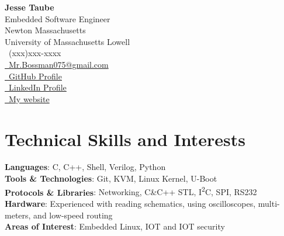 \documentclass[a4paper,11pt]{article}
\makeatletter
\newcommand{\phone}{(xxx)xxx-xxxx}
\newcommand{\email}{Mr.Bossman075@gmail.com}
\makeatother
\begin{document}
\selectfont
{
\begin{multicols}{2}
	\textbf{\Large Jesse Taube} \\
	{{\footnotesize \faMicrochip} Embedded Software Engineer} \\
	{{\footnotesize \faMapMarker} Newton Massachusetts} \\
	{{\footnotesize \faGraduationCap} University of Massachusetts Lowell} \\
	\vfill\null
	\RaggedLeft
	{\raisebox{0.0\height}{\footnotesize \faPhone}\ \phone} \\
	{\href{mailto:\email}{\raisebox{0.0\height}{\footnotesize \faEnvelope}\ {\email}}} \\
	{\href{https://github.com/Mr-Bossman}{\raisebox{0.0\height}{\footnotesize \faGithub}\ {GitHub Profile}}} \\
	{\href{https://www.linkedin.com/in/jesse-taube-749351229/}{\raisebox{0.0\height}{\footnotesize \faLinkedin}\ {LinkedIn Profile}}} \\
	{\href{https://jachan.dev}{\raisebox{0.0\height}{\footnotesize \faGlobe}\ {My website}}}
\end{multicols}
}
\vspace{-3mm}

\section{\textbf{Technical Skills and Interests}}
\begin{itemize}[leftmargin=0.05in, label={}]
		\small{\item{
		 \textbf{Languages}{: C, C++, Shell, Verilog, Python} \\
		 \textbf{Tools \& Technologies}{: Git, KVM, Linux Kernel, U-Boot} \\
		 \textbf{Protocols \& Libraries}{: Networking, C\&C++ STL, I\textsuperscript{2}C, SPI, RS232}\\
		 \textbf{Hardware}{: Experienced with reading schematics, using oscilloscopes, multi-meters, and low-speed routing} \\
		 \textbf{Areas of Interest}{: Embedded Linux, IOT and IOT security} \\
		}}
\end{itemize}
\vspace{-16pt}
\end{document}
